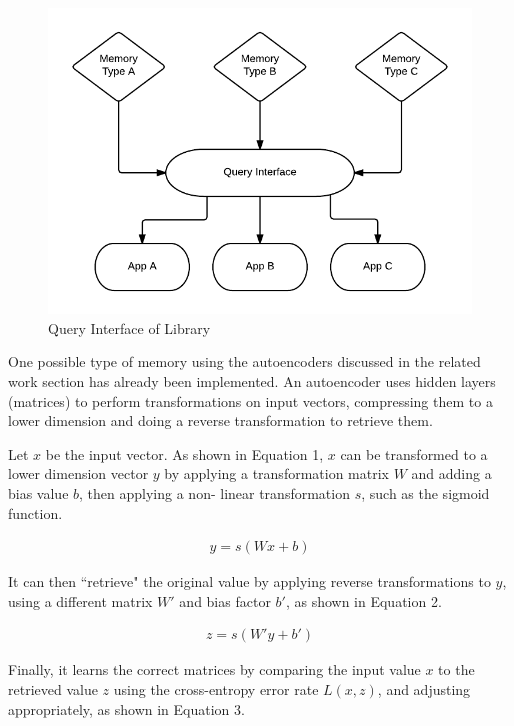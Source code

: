 \documentclass{sig-alternate}
\begin{document}
\begin{figure}[h]
	\begin{center}
		\includegraphics[width=1\linewidth]{queryint}
	\end{center}
	\vspace{-12pt}
	\caption{Query Interface of Library}
	\label{fig:queryint}
\end{figure}

One possible type of memory using the autoencoders discussed in the related work
section has already been implemented. An autoencoder uses hidden layers (matrices) to perform 
transformations on input vectors, compressing them to a lower dimension and doing a reverse 
transformation to retrieve them. 

Let $x$ be the input vector. As shown in Equation 1, $x$ can be transformed to a lower dimension 
vector $y$ by applying a transformation matrix $W$ and adding a bias value $b$, then applying a non-
linear transformation $s$, such as the sigmoid function.

\begin{gather}
y = s(Wx + b)
\end{gather}

It can then ``retrieve" the original value by applying reverse transformations to $y$, using
a different matrix $W'$ and bias factor $b'$, as shown in Equation 2.

\begin{gather}
z = s(W' y  + b')
\end{gather}

Finally, it learns the correct matrices by comparing the input value $x$ to the retrieved value $z$ 
using the cross-entropy error rate $L(x,z)$, and adjusting appropriately, as shown in Equation 3.
\end{document}
